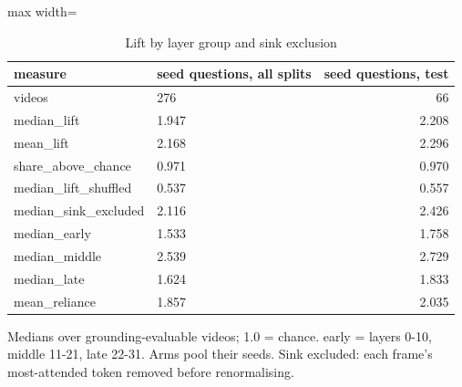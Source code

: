 \begin{table}[htbp]
\centering
\scriptsize
\caption{Lift by layer group and sink exclusion}\label{tab:R2s}
\begin{adjustbox}{max width=\textwidth}
\begin{tabular}{llr}
\toprule
measure & seed questions, all splits & seed questions, test \\
\midrule
videos & 276 & 66 \\
median\_lift & 1.947 & 2.208 \\
mean\_lift & 2.168 & 2.296 \\
share\_above\_chance & 0.971 & 0.970 \\
median\_lift\_shuffled & 0.537 & 0.557 \\
median\_sink\_excluded & 2.116 & 2.426 \\
median\_early & 1.533 & 1.758 \\
median\_middle & 2.539 & 2.729 \\
median\_late & 1.624 & 1.833 \\
mean\_reliance & 1.857 & 2.035 \\
\bottomrule
\end{tabular}
\end{adjustbox}
\par\smallskip\parbox{\textwidth}{\footnotesize Medians over grounding-evaluable videos; 1.0 = chance. early = layers 0-10, middle 11-21, late 22-31. Arms pool their seeds. Sink excluded: each frame's most-attended token removed before renormalising.}
\end{table}

